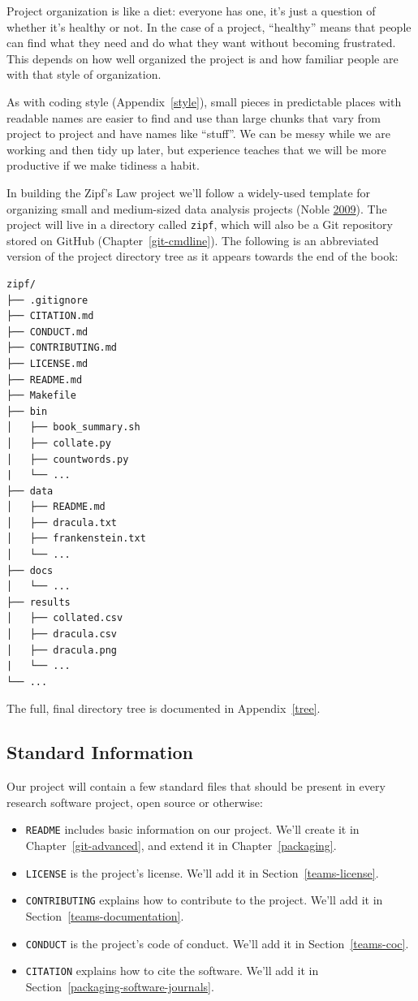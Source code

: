 \documentclass[
]{krantz}
\begin{document}
Project organization is like a diet:
everyone has one,
it's just a question of whether it's healthy or not.
In the case of a project,
``healthy'' means that people can find what they need and do what they want without becoming frustrated.
This depends on how well organized the project is
and how familiar people are with that style of organization.

As with coding style (Appendix~\ref{style}),
small pieces in predictable places with readable names are easier to find and use
than large chunks that vary from project to project and have names like ``stuff''.
We can be messy while we are working and then tidy up later,
but experience teaches that we will be more productive if we make tidiness a habit.

In building the Zipf's Law project we'll follow
a widely-used template
for organizing small and medium-sized data analysis projects (Noble \protect\hyperlink{ref-Nobl2009}{2009}).
The project will live in a directory called \texttt{zipf},
which will also be a Git repository stored on GitHub (Chapter~\ref{git-cmdline}).
The following is an abbreviated version of the project directory tree
as it appears towards the end of the book:

\begin{verbatim}
zipf/
├── .gitignore
├── CITATION.md
├── CONDUCT.md
├── CONTRIBUTING.md   
├── LICENSE.md   
├── README.md
├── Makefile   
├── bin   
│   ├── book_summary.sh   
│   ├── collate.py   
│   ├── countwords.py   
|   └── ...    
├── data
│   ├── README.md   
│   ├── dracula.txt  
│   ├── frankenstein.txt  
│   └── ...   
├── docs
│   └── ...
├── results
│   ├── collated.csv
│   ├── dracula.csv
│   ├── dracula.png
|   └── ...
└── ...
\end{verbatim}

The full, final directory tree is documented in Appendix~\ref{tree}.

\hypertarget{intro-boilerplate}{%
\subsection{Standard Information}\label{intro-boilerplate}}

Our project will contain a few standard files
that should be present in every research software project,
open source or otherwise:

\begin{itemize}
\item
  \texttt{README} includes basic information on our project.
  We'll create it in Chapter~\ref{git-advanced},
  and extend it in Chapter~\ref{packaging}.
\item
  \texttt{LICENSE} is the project's license. We'll add it in Section~\ref{teams-license}.
\item
  \texttt{CONTRIBUTING} explains how to contribute to the project. We'll add it in Section~\ref{teams-documentation}.
\item
  \texttt{CONDUCT} is the project's code of conduct. We'll add it in Section~\ref{teams-coc}.
\item
  \texttt{CITATION} explains how to cite the software. We'll add it in Section~\ref{packaging-software-journals}.
\end{itemize}
\end{document}
